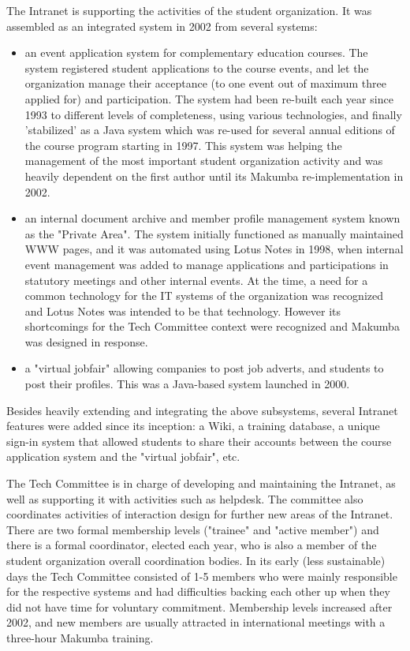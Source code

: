 \documentclass{acm_proc_article-sp}
\begin{document}
The Intranet is supporting the activities of the student organization. It was assembled as an integrated system in 2002 from several systems: 
\begin{itemize}
\item an event application system for complementary education courses. The system registered student applications to the course events, and let the organization manage their acceptance (to one event out of maximum three applied for) and participation. The system had been re-built each year since 1993 to different levels of completeness, using various technologies, and finally 'stabilized' as a Java system which was  re-used for several annual editions of the course program starting in 1997. This system was helping the management of the most important student organization activity and was heavily dependent on the first author until its Makumba re-implementation in 2002.
\item an internal document archive and member profile management system known as the "Private Area". The system initially functioned as manually maintained WWW pages, and it was automated using Lotus Notes in 1998, when internal event management was added to manage applications and participations in statutory meetings and other internal events. At the time, a need for a common technology for the IT systems of the organization was recognized and Lotus Notes was intended to be that technology. However its shortcomings for the Tech Committee context were recognized and Makumba was designed in response.
\item a "virtual jobfair" allowing companies to post job adverts, and students to post their profiles. This was a Java-based system launched in 2000.
\end{itemize}
Besides heavily extending and integrating the above subsystems, several Intranet features were added since its inception: a Wiki, a training database, a unique sign-in system that allowed students to share their accounts between the course application system and the "virtual jobfair", etc.

The Tech Committee is in charge of developing and maintaining the Intranet, as well as supporting it with activities such as helpdesk. The committee also coordinates activities of interaction design for further new areas of the Intranet. There are two formal membership levels ("trainee" and "active member") and there is a formal coordinator, elected each year, who is also a member of the student organization overall coordination bodies. In its early (less sustainable) days the Tech Committee consisted of 1-5 members who were mainly responsible for the respective systems and had difficulties backing each other up when they did not have time for voluntary commitment. Membership levels increased after 2002, and new members are usually attracted in international meetings with a three-hour Makumba training.
\end{document}
